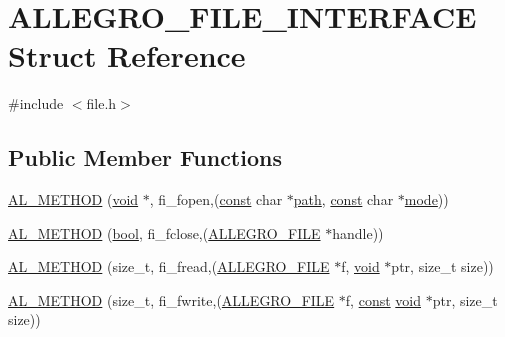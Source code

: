 \hypertarget{struct_a_l_l_e_g_r_o___f_i_l_e___i_n_t_e_r_f_a_c_e}{}\section{A\+L\+L\+E\+G\+R\+O\+\_\+\+F\+I\+L\+E\+\_\+\+I\+N\+T\+E\+R\+F\+A\+CE Struct Reference}
\label{struct_a_l_l_e_g_r_o___f_i_l_e___i_n_t_e_r_f_a_c_e}


{\ttfamily \#include $<$file.\+h$>$}

\subsection*{Public Member Functions}
\begin{DoxyCompactItemize}
\item 
\hyperlink{struct_a_l_l_e_g_r_o___f_i_l_e___i_n_t_e_r_f_a_c_e_a2bfb83f570816b8fbe7aa0427c59d71e}{A\+L\+\_\+\+M\+E\+T\+H\+OD} (\hyperlink{png_8h_ac9c84fa68bbad002983e35ce3663c686}{void} $\ast$, fi\+\_\+fopen,(\hyperlink{zconf_8h_a2c212835823e3c54a8ab6d95c652660e}{const} char $\ast$\hyperlink{group___library_merger_ga79bd92474fc256263841144176127d9b}{path}, \hyperlink{zconf_8h_a2c212835823e3c54a8ab6d95c652660e}{const} char $\ast$\hyperlink{png_8h_a3eabae3e1e65723a7ec3445646cb7795}{mode}))
\item 
\hyperlink{struct_a_l_l_e_g_r_o___f_i_l_e___i_n_t_e_r_f_a_c_e_a6a4bf0472893ec38d1137e04992d68b1}{A\+L\+\_\+\+M\+E\+T\+H\+OD} (\hyperlink{astdbool_8h_abb452686968e48b67397da5f97445f5b}{bool}, fi\+\_\+fclose,(\hyperlink{file_8h_a9c6d4681b238d8c79191fd6fcc4bd6f8}{A\+L\+L\+E\+G\+R\+O\+\_\+\+F\+I\+LE} $\ast$handle))
\item 
\hyperlink{struct_a_l_l_e_g_r_o___f_i_l_e___i_n_t_e_r_f_a_c_e_a719605bd87bd8e2ace1929129f5bc587}{A\+L\+\_\+\+M\+E\+T\+H\+OD} (size\+\_\+t, fi\+\_\+fread,(\hyperlink{file_8h_a9c6d4681b238d8c79191fd6fcc4bd6f8}{A\+L\+L\+E\+G\+R\+O\+\_\+\+F\+I\+LE} $\ast$f, \hyperlink{png_8h_ac9c84fa68bbad002983e35ce3663c686}{void} $\ast$ptr, size\+\_\+t size))
\item 
\hyperlink{struct_a_l_l_e_g_r_o___f_i_l_e___i_n_t_e_r_f_a_c_e_a928f307b3f826c8abd2ece07aa3aa91b}{A\+L\+\_\+\+M\+E\+T\+H\+OD} (size\+\_\+t, fi\+\_\+fwrite,(\hyperlink{file_8h_a9c6d4681b238d8c79191fd6fcc4bd6f8}{A\+L\+L\+E\+G\+R\+O\+\_\+\+F\+I\+LE} $\ast$f, \hyperlink{zconf_8h_a2c212835823e3c54a8ab6d95c652660e}{const} \hyperlink{png_8h_ac9c84fa68bbad002983e35ce3663c686}{void} $\ast$ptr, size\+\_\+t size))

\end{DoxyCompactItemize}
